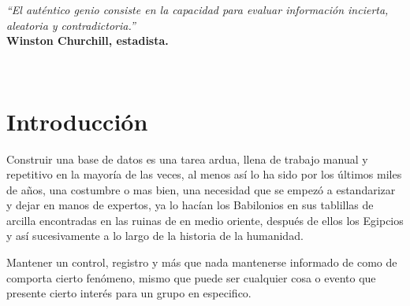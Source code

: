 \documentclass[12pt]{article} %
\begin{document}

\tableofcontents %

\newpage %
\setcounter{page}{1}
	
	\begin{minipage}{0.5\textwidth}
		\begin{flushleft} \large
		\scriptsize	\textsl{\large “El auténtico genio consiste en la capacidad para evaluar información incierta, aleatoria y contradictoria.”}\\
		\scriptsize \textbf{Winston Churchill, estadista.}
		\end{flushleft}
	\end{minipage}\\[4cm]
			
		 
\newpage		 
     

\section*{Introducci\'on}
		Construir una base de datos es una tarea ardua, llena de trabajo manual y repetitivo en la mayoría de las veces, al menos así lo ha sido por los \'ultimos
	miles de a\~nos, una costumbre o mas bien, una necesidad que se empezó a estandarizar y dejar en manos de expertos, ya lo hacían los Babilonios en sus tablillas
	de arcilla encontradas en las ruinas de en medio oriente, después de ellos los Egipcios y as\'i sucesivamente a lo largo de la historia de la humanidad.
	
	Mantener un control, registro y m\'as que nada mantenerse informado de como de comporta cierto fenómeno, mismo que puede ser cualquier cosa o evento que presente 
	cierto interés para un grupo en especifico.
	
\end{document}
